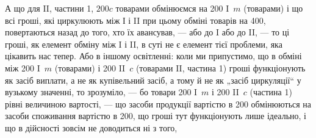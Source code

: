 А що для II, частини 1, $200 c$ товарами обмінюємся на 200 I~$m$
(товарами) і що всі гроші, які циркулюють між І і II при цьому обміні
товарів на 400, повертаються назад до того, хто їх авансував, — або до
I або до II, — то ці гроші, як елемент обміну між I і II, в суті не є
елемент тієї проблеми, яка цікавить нас тепер. Або в іншому освітленні:
коли ми припустимо, що в обміні між 200 I~$m$ (товарами) і 200 II~$c$
(товарами II, частина 1) гроші функціонують як засіб виплати, а не як
купівельний засіб, а тому й не як „засіб циркуляції“ у вузькому значенні,
то зрозуміло, — бо товари 200 I~$m$ і 200 II~$c$ (частина 1)
рівні величиною вартості, — що засоби продукції вартістю в 200 обмінюються
на засоби споживання вартістю в 200, що гроші тут функціонують
лише ідеально, і що в дійсності зовсім не доводиться ні з того,
\parbreak{}  %
